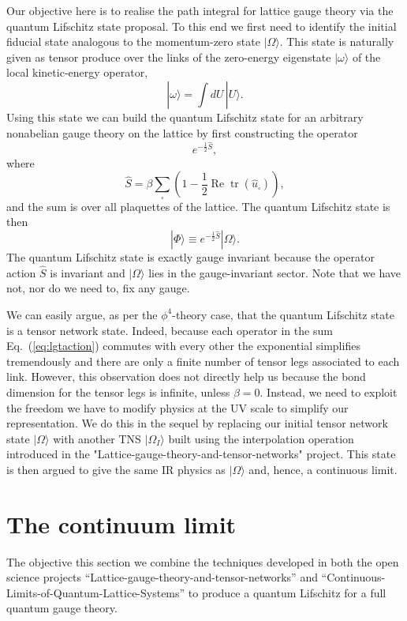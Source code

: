 \documentclass[twocolumn,lengthcheck,superscriptaddress]{revtex4-1}
\newcommand{\tr}{\operatorname{tr}}
\newcommand{\real}{\operatorname{Re}}
\theoremstyle{definition}
\theoremstyle{remark}
\begin{document}
Our objective here is to realise the path integral for lattice gauge theory via the quantum Lifschitz state proposal. To this end we first need to identify the initial fiducial state analogous to the momentum-zero state $|\Omega\rangle$. This state is naturally given as tensor produce over the links of the zero-energy eigenstate $|\omega\rangle$ of the local kinetic-energy operator, 
\begin{equation}
	|\omega\rangle = \int dU \,|U\rangle.
\end{equation}
Using this state we can build the quantum Lifschitz state for an arbitrary nonabelian gauge theory on the lattice by first constructing the operator 
\begin{equation}
	e^{-\frac12\widehat{S}},
\end{equation}
where
\begin{equation}\label{eq:lgtaction}
	\widehat{S} = \beta\sum_{\square} \left(1 - \frac{1}{2}\real\tr(\widehat{u}_\square)\right),
\end{equation}
and the sum is over all plaquettes of the lattice. The quantum Lifschitz state is then
\begin{equation}
	|\Phi\rangle \equiv e^{-\frac12\widehat{S}}|\Omega\rangle. 
\end{equation}
The quantum Lifschitz state is exactly gauge invariant because the operator action $\widehat{S}$ is invariant and $|\Omega\rangle$ lies in the gauge-invariant sector. Note that we have not, nor do we need to, fix any gauge. 

We can easily argue, as per the $\phi^4$-theory case, that the quantum Lifschitz state is a tensor network state. Indeed, because each operator in the sum Eq.~(\ref{eq:lgtaction}) commutes with every other the exponential simplifies tremendously and there are only a finite number of tensor legs associated to each link. However, this observation does not directly help us because the bond dimension for the tensor legs is infinite, unless $\beta = 0$. Instead, we need to exploit the freedom we have to modify physics at the UV scale to simplify our representation. We do this in the sequel by replacing our initial tensor network state $|\Omega\rangle$ with another TNS $|\Omega_I\rangle$ built using the interpolation operation introduced in the "Lattice-gauge-theory-and-tensor-networks" project. This state is then argued to give the same IR physics as $|\Omega\rangle$ and, hence, a continuous limit.

\section{The continuum limit}
The objective this section we combine the techniques developed in both the open science projects ``Lattice-gauge-theory-and-tensor-networks'' and ``Continuous-Limits-of-Quantum-Lattice-Systems'' to produce a quantum Lifschitz for a full quantum gauge theory.
\end{document}
